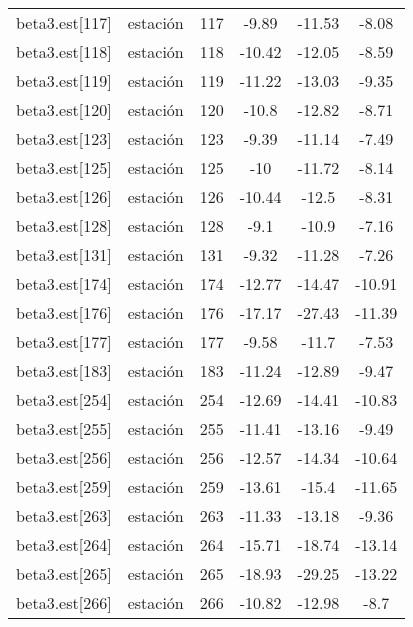 \begin{table}[]
\begin{tabular}{cccccc}
beta3.est{[}117{]}    & estación             & 117    & -9.89  & -11.53 & -8.08   \\
beta3.est{[}118{]}    & estación             & 118    & -10.42 & -12.05 & -8.59   \\
beta3.est{[}119{]}    & estación             & 119    & -11.22 & -13.03 & -9.35   \\
beta3.est{[}120{]}    & estación             & 120    & -10.8  & -12.82 & -8.71   \\
beta3.est{[}123{]}    & estación             & 123    & -9.39  & -11.14 & -7.49   \\
beta3.est{[}125{]}    & estación             & 125    & -10    & -11.72 & -8.14   \\
beta3.est{[}126{]}    & estación             & 126    & -10.44 & -12.5  & -8.31   \\
beta3.est{[}128{]}    & estación             & 128    & -9.1   & -10.9  & -7.16   \\
beta3.est{[}131{]}    & estación             & 131    & -9.32  & -11.28 & -7.26   \\
beta3.est{[}174{]}    & estación             & 174    & -12.77 & -14.47 & -10.91  \\
beta3.est{[}176{]}    & estación             & 176    & -17.17 & -27.43 & -11.39  \\
beta3.est{[}177{]}    & estación             & 177    & -9.58  & -11.7  & -7.53   \\
beta3.est{[}183{]}    & estación             & 183    & -11.24 & -12.89 & -9.47   \\
beta3.est{[}254{]}    & estación             & 254    & -12.69 & -14.41 & -10.83  \\
beta3.est{[}255{]}    & estación             & 255    & -11.41 & -13.16 & -9.49   \\
beta3.est{[}256{]}    & estación             & 256    & -12.57 & -14.34 & -10.64  \\
beta3.est{[}259{]}    & estación             & 259    & -13.61 & -15.4  & -11.65  \\
beta3.est{[}263{]}    & estación             & 263    & -11.33 & -13.18 & -9.36   \\
beta3.est{[}264{]}    & estación             & 264    & -15.71 & -18.74 & -13.14  \\
beta3.est{[}265{]}    & estación             & 265    & -18.93 & -29.25 & -13.22  \\
beta3.est{[}266{]}    & estación             & 266    & -10.82 & -12.98 & -8.7    \\

\end{tabular}
\end{table}
